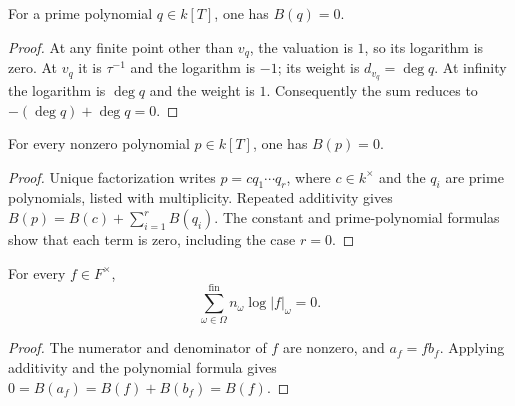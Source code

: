 \begin{lemma}
\label{lem:ff-prime-product-formula}
\leanok
{}
For a prime polynomial $q\in k[T]$, one has $B(q)=0$.
\end{lemma}
\begin{proof}
At any finite point other than $v_q$, the valuation is $1$, so its
logarithm is zero. At $v_q$ it is $\tau^{-1}$ and the logarithm is
$-1$; its weight is $d_{v_q}=\deg q$. At infinity the logarithm is
$\deg q$ and the weight is $1$. Consequently the sum reduces to
$-(\deg q)+\deg q=0$.
\end{proof}

\begin{lemma}\label{lem:ff-polynomial-product-formula}
\leanok
{}
For every nonzero polynomial $p\in k[T]$, one has $B(p)=0$.
\end{lemma}
\begin{proof}
Unique factorization writes $p=cq_1\cdots q_r$, where $c\in k^\times$
and the $q_i$ are prime polynomials, listed with multiplicity.
Repeated additivity gives
$B(p)=B(c)+\sum_{i=1}^r B(q_i)$. The constant and prime-polynomial
formulas show that each term is zero, including the case $r=0$.
\end{proof}

\begin{theorem}\label{thm:ff-product-formula}
\leanok
{}
For every $f\in F^\times$,
\[
 \sum_{\omega\in\Omega}^{\mathrm{fin}}n_\omega\log|f|_\omega=0.
\]
\end{theorem}
\begin{proof}
The numerator and denominator of $f$ are nonzero, and
$a_f=f b_f$. Applying additivity and the polynomial formula gives
$0=B(a_f)=B(f)+B(b_f)=B(f)$.
\end{proof}

